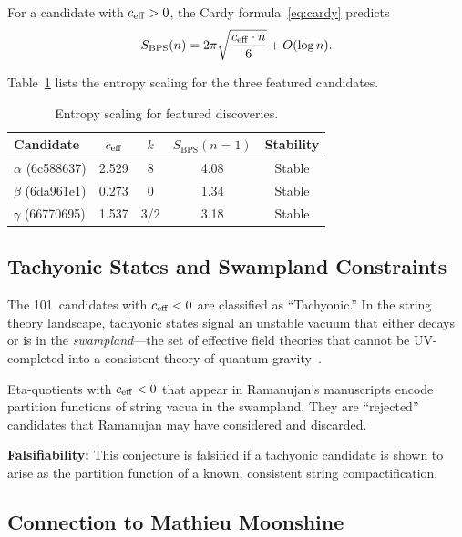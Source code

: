 For a candidate with $c_{\mathrm{eff}} > 0$, the Cardy
formula~\eqref{eq:cardy} predicts
\begin{equation}
  S_{\mathrm{BPS}}(n)
  = 2\pi \sqrt{\frac{c_{\mathrm{eff}} \cdot n}{6}}
  + O(\log n).
\end{equation}

Table~\ref{tab:entropy_scaling} lists the entropy scaling
for the three featured candidates.

\begin{table}[H]
\centering
\caption{Entropy scaling for featured discoveries.}
\label{tab:entropy_scaling}
\begin{tabular}{lcccc}
\toprule
\textbf{Candidate} & $c_{\mathrm{eff}}$ & $k$ &
  $S_{\mathrm{BPS}}(n=1)$ & \textbf{Stability} \\
\midrule
$\alpha$ (6c588637) & 2.529 & 8 & 4.08 & Stable \\
$\beta$ (6da961e1) & 0.273 & 0 & 1.34 & Stable \\
$\gamma$ (66770695) & 1.537 & 3/2 & 3.18 & Stable \\
\bottomrule
\end{tabular}
\end{table}

\subsection{Tachyonic States and Swampland Constraints}

The 101~candidates with $c_{\mathrm{eff}} < 0$ are classified as
``Tachyonic.''  In the string theory landscape,
tachyonic states signal an unstable vacuum that either
decays or is in the \emph{swampland}---the set of
effective field theories that cannot be UV-completed
into a consistent theory of quantum
gravity~\cite{strominger_vafa_1996}.

\begin{conjecture}
\label{conj:swampland}
Eta-quotients with $c_{\mathrm{eff}} < 0$ that appear in Ramanujan's
manuscripts encode partition functions of string vacua in
the swampland.  They are ``rejected'' candidates that
Ramanujan may have considered and discarded.
\end{conjecture}

\textbf{Falsifiability:} This conjecture is falsified if
a tachyonic candidate is shown to arise as the partition
function of a known, consistent string compactification.

\subsection{Connection to Mathieu Moonshine}

